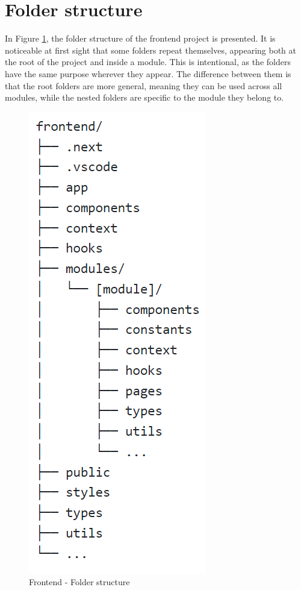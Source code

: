 \section{Folder structure}

In Figure \ref{fig:figure5}, the folder structure of the frontend project is presented. It is noticeable at first sight that some folders repeat themselves, appearing both at the root of the project and inside a module. This is intentional, as the folders have the same purpose wherever they appear. The difference between them is that the root folders are more general, meaning they can be used across all modules, while the nested folders are specific to the module they belong to.

\begin{figure}[h]
    \centering
    \includegraphics[scale=0.75]{images/frontend-folder-structure.png}
    \caption{Frontend - Folder structure}
    \label{fig:figure5}
\end{figure}

